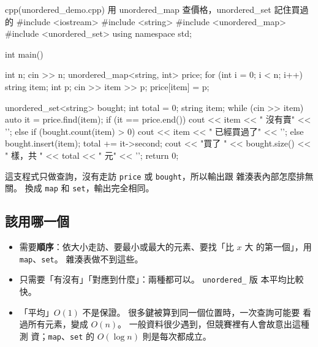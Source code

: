 \begin{example}[label=ex:unordered]{cpp}{(unordered\_demo.cpp) 用 unordered\_map 查價格，unordered\_set 記住買過的}
#include <iostream>
#include <string>
#include <unordered_map>
#include <unordered_set>
using namespace std;

int main() {
    int n;
    cin >> n;
    unordered_map<string, int> price;
    for (int i = 0; i < n; i++) {
        string item;
        int p;
        cin >> item >> p;
        price[item] = p;
    }

    unordered_set<string> bought;
    int total = 0;
    string item;
    while (cin >> item) {
        auto it = price.find(item);
        if (it == price.end()) {
            cout << item << " 沒有賣" << '\n';
        } else if (bought.count(item) > 0) {
            cout << item << " 已經買過了" << '\n';
        } else {
            bought.insert(item);
            total += it->second;
        }
    }
    cout << "買了 " << bought.size() << " 樣，共 " << total << " 元" << '\n';
    return 0;
}
\end{example}


這支程式只做查詢，沒有走訪 \texttt{price} 或 \texttt{bought}，所以輸出跟
雜湊表內部怎麼排無關。 換成 \texttt{map} 和 \texttt{set}，輸出完全相同。

\subsection{該用哪一個}

\begin{itemize}
\item 需要\textbf{順序}：依大小走訪、要最小或最大的元素、要找「比 $x$ 大
的第一個」，用 \texttt{map}、\texttt{set}。 雜湊表做不到這些。
\item 只需要「有沒有」「對應到什麼」：兩種都可以。 \texttt{unordered\_} 版
本平均比較快。
\item 「平均」$O(1)$ 不是保證。 很多鍵被算到同一個位置時，一次查詢可能要
看過所有元素，變成 $O(n)$。 一般資料很少遇到，但競賽裡有人會故意出這種測
資；\texttt{map}、\texttt{set} 的 $O(\log n)$ 則是每次都成立。
\end{itemize}


